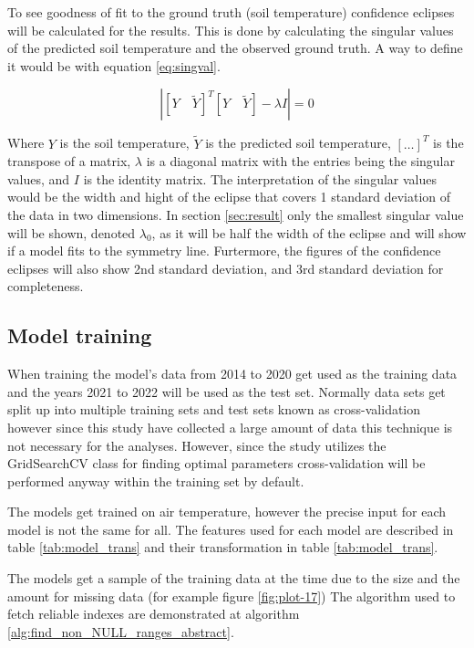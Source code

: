 To see goodness of fit to the ground truth (soil temperature) confidence eclipses will be calculated for the results. This is done by calculating the singular values of the predicted soil temperature and the observed ground truth. A way to define it would be with equation \eqref{eq:singval}.

\begin{equation}
	\left|\left[Y \quad \tilde{Y}\right]^T \left[Y \quad \tilde{Y}\right] -\lambda I\right| = 0\label{eq:singval}
\end{equation}

Where $Y$ is the soil temperature, $\tilde{Y}$ is the predicted soil temperature, $[\dots]^T$ is the transpose of a matrix, $\lambda$ is a diagonal matrix with the entries being the singular values, and $I$ is the identity matrix. The interpretation of the singular values would be the width and hight of the eclipse that covers 1 standard deviation of the data in two dimensions. In section \ref{sec:result} only the smallest singular value will be shown, denoted $\lambda_0$, as it will be half the width of the eclipse and will show if a model fits to the symmetry line. Furtermore, the figures of the confidence eclipses will also show 2nd standard deviation, and 3rd standard deviation for completeness. 

\subsection{Model training}

When training the model's data from 2014 to 2020 get used as the training data and the years 2021 to 2022 will be used as the test set. Normally data sets get split up into multiple training sets and test sets known as cross-validation however since this study have collected a large amount of data this technique is not necessary for the analyses. However, since the study utilizes the GridSearchCV class for finding optimal parameters cross-validation will be performed anyway within the training set by default.

The models get trained on air temperature, however the precise input for each model is not the same for all. The features used for each model are described in table \ref{tab:model_trans} and their transformation in table \ref{tab:model_trans}.

The models get a sample of the training data at the time due to the size and the amount for missing data (for example figure \ref{fig:plot-17}) The algorithm used to fetch reliable indexes are demonstrated at algorithm \ref{alg:find_non_NULL_ranges_abstract}.

